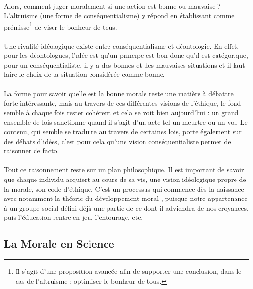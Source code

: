 \documentclass[10pt, french, a4paper]{report}
\begin{document}
\paragraph{}
Alors, comment juger moralement si une action est bonne ou mauvaise ? L’altruisme (une forme de conséquentialisme) y répond en établissant comme prémisse\footnote{Il s'agit d'une proposition avancée afin de supporter une conclusion, dans le cas de l'altruisme : optimiser le bonheur de tous.} de viser le bonheur de tous.

\paragraph{}
Une rivalité idéologique existe entre conséquentialisme et déontologie. En effet, pour les déontologues, l’idée est qu’un principe est bon donc qu’il est catégorique, pour un conséquentialiste, il y a des bonnes et des mauvaises situations et il faut faire le choix de la situation considérée comme bonne.

\paragraph{}
La forme pour savoir quelle est la bonne morale reste une matière à débattre forte intéressante, mais au travers de ces différentes visions de l’éthique, le fond semble à chaque fois rester cohérent et cela se voit bien aujourd’hui : un grand ensemble de lois sanctionne quand il s’agit d’un acte tel un meurtre ou un vol. Le contenu, qui semble se traduire au travers de certaines lois, porte également sur des débats d’idées, c’est pour cela qu’une vision conséquentialiste permet de raisonner de facto.

\paragraph{}
Tout ce raisonnement reste sur un plan philosophique. Il est important de savoir que chaque individu acquiert au cours de sa vie, une vision idéologique propre de la morale, son code d’éthique. C’est un processus qui commence dès la naissance avec notamment la théorie du développement moral \citep{kohlberg_moral_1977}, puisque notre appartenance à un groupe social défini déjà une partie de ce dont il adviendra de nos croyances, puis l’éducation rentre en jeu, l’entourage, etc.

\subsection{La Morale en Science}
\label{subsec:morale_science}
\end{document}
